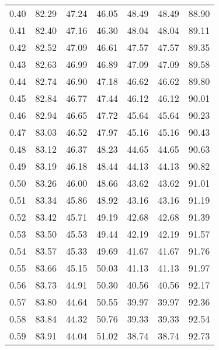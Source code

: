 \begin{tabular}{|c|c|c|c|c|c|c|}
      0.40 &     82.29 &     47.24 &      46.05 &   48.49 &      48.49 &         88.90 \\
      0.41 &     82.40 &     47.16 &      46.30 &   48.04 &      48.04 &         89.11 \\
      0.42 &     82.52 &     47.09 &      46.61 &   47.57 &      47.57 &         89.35 \\
      0.43 &     82.63 &     46.99 &      46.89 &   47.09 &      47.09 &         89.58 \\
      0.44 &     82.74 &     46.90 &      47.18 &   46.62 &      46.62 &         89.80 \\
      0.45 &     82.84 &     46.77 &      47.44 &   46.12 &      46.12 &         90.01 \\
      0.46 &     82.94 &     46.65 &      47.72 &   45.64 &      45.64 &         90.23 \\
      0.47 &     83.03 &     46.52 &      47.97 &   45.16 &      45.16 &         90.43 \\
      0.48 &     83.12 &     46.37 &      48.23 &   44.65 &      44.65 &         90.63 \\
      0.49 &     83.19 &     46.18 &      48.44 &   44.13 &      44.13 &         90.82 \\
      0.50 &     83.26 &     46.00 &      48.66 &   43.62 &      43.62 &         91.01 \\
      0.51 &     83.34 &     45.86 &      48.92 &   43.16 &      43.16 &         91.19 \\
      0.52 &     83.42 &     45.71 &      49.19 &   42.68 &      42.68 &         91.39 \\
      0.53 &     83.50 &     45.53 &      49.44 &   42.19 &      42.19 &         91.57 \\
      0.54 &     83.57 &     45.33 &      49.69 &   41.67 &      41.67 &         91.76 \\
      0.55 &     83.66 &     45.15 &      50.03 &   41.13 &      41.13 &         91.97 \\
      0.56 &     83.73 &     44.91 &      50.30 &   40.56 &      40.56 &         92.17 \\
      0.57 &     83.80 &     44.64 &      50.55 &   39.97 &      39.97 &         92.36 \\
      0.58 &     83.84 &     44.32 &      50.76 &   39.33 &      39.33 &         92.54 \\
      0.59 &     83.91 &     44.04 &      51.02 &   38.74 &      38.74 &         92.73 \\

\end{tabular}
